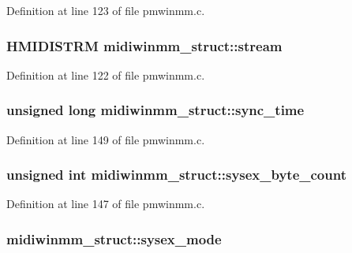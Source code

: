 Definition at line 123 of file pmwinmm.\+c.

\subsubsection[{\texorpdfstring{stream}{stream}}]{\setlength{\rightskip}{0pt plus 5cm}H\+M\+I\+D\+I\+S\+T\+RM midiwinmm\+\_\+struct\+::stream}\hypertarget{structmidiwinmm__struct_a117032659ec71d42b33f1be4c0a7889c}{}\label{structmidiwinmm__struct_a117032659ec71d42b33f1be4c0a7889c}


Definition at line 122 of file pmwinmm.\+c.

\subsubsection[{\texorpdfstring{sync\+\_\+time}{sync_time}}]{\setlength{\rightskip}{0pt plus 5cm}unsigned long midiwinmm\+\_\+struct\+::sync\+\_\+time}\hypertarget{structmidiwinmm__struct_aacee5aeff23bb17834bf177a2e1e6f56}{}\label{structmidiwinmm__struct_aacee5aeff23bb17834bf177a2e1e6f56}


Definition at line 149 of file pmwinmm.\+c.

\subsubsection[{\texorpdfstring{sysex\+\_\+byte\+\_\+count}{sysex_byte_count}}]{\setlength{\rightskip}{0pt plus 5cm}unsigned {\bf int} midiwinmm\+\_\+struct\+::sysex\+\_\+byte\+\_\+count}\hypertarget{structmidiwinmm__struct_a27999ff2b46ab6855ca33f936af1020e}{}\label{structmidiwinmm__struct_a27999ff2b46ab6855ca33f936af1020e}


Definition at line 147 of file pmwinmm.\+c.

\subsubsection[{\texorpdfstring{sysex\+\_\+mode}{sysex_mode}}]{ midiwinmm\+\_\+struct\+::sysex\+\_\+mode}\hypertarget{structmidiwinmm__struct_a8b4b27e9b67b6002716c35ba507efbc4}{}\label{structmidiwinmm__struct_a8b4b27e9b67b6002716c35ba507efbc4}


